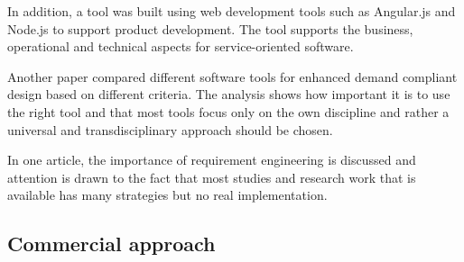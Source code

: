     In addition, a tool was built using web development tools such as Angular.js and Node.js to support product development. The tool supports the business, operational and technical aspects for service-oriented software.~\cite{belfadel2022requirements}


    Another paper compared different software tools for enhanced demand compliant design based on different criteria. The analysis shows how important it is to use the right tool and that most tools focus only on the own discipline and rather a universal and transdisciplinary approach should be chosen.~\cite{9447081}

    In one article, the importance of requirement engineering is discussed and attention is drawn to the fact that most studies and research work that is available has many strategies but no real implementation.~\cite{kumar2022requirements}




    \subsection*{Commercial approach}


